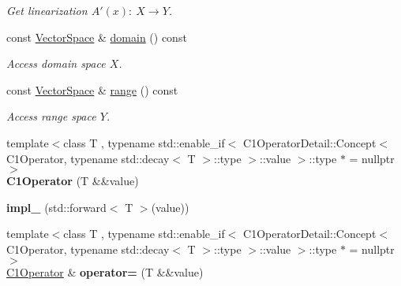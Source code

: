 \begin{DoxyCompactItemize}
\begin{DoxyCompactList}\small\item\em \-Get linearization $A'(x):\ X\to Y $. \end{DoxyCompactList}\item 
\hypertarget{classSpacy_1_1C1Operator_aee0ffd5cee0b8a8df2f0b67b5aaf0ddb}{const \hyperlink{classSpacy_1_1VectorSpace}{\-Vector\-Space} \& \hyperlink{classSpacy_1_1C1Operator_aee0ffd5cee0b8a8df2f0b67b5aaf0ddb}{domain} () const }\label{classSpacy_1_1C1Operator_aee0ffd5cee0b8a8df2f0b67b5aaf0ddb}

\begin{DoxyCompactList}\small\item\em \-Access domain space $X$. \end{DoxyCompactList}\item 
\hypertarget{classSpacy_1_1C1Operator_a7df27427591907b13776e7ba3707bf05}{const \hyperlink{classSpacy_1_1VectorSpace}{\-Vector\-Space} \& \hyperlink{classSpacy_1_1C1Operator_a7df27427591907b13776e7ba3707bf05}{range} () const }\label{classSpacy_1_1C1Operator_a7df27427591907b13776e7ba3707bf05}

\begin{DoxyCompactList}\small\item\em \-Access range space $Y$. \end{DoxyCompactList}\item 
\hypertarget{classSpacy_1_1C1Operator_a9a46e9d2fb4526fa320480b832c5b71e}{{\footnotesize template$<$class T , typename std\-::enable\-\_\-if$<$ C1\-Operator\-Detail\-::\-Concept$<$ C1\-Operator, typename std\-::decay$<$ T $>$\-::type $>$\-::value $>$\-::type $\ast$  = nullptr$>$ }\\{\bfseries \-C1\-Operator} (\-T \&\&value)}\label{classSpacy_1_1C1Operator_a9a46e9d2fb4526fa320480b832c5b71e}

\item 
\hypertarget{classSpacy_1_1C1Operator_ae4068d2989e5aa71b372def134afdd78}{{\bfseries impl\-\_\-} (std\-::forward$<$ \-T $>$(value))}\label{classSpacy_1_1C1Operator_ae4068d2989e5aa71b372def134afdd78}

\item 
\hypertarget{classSpacy_1_1C1Operator_aecfc71bf5da728a9028a586e50afbfcf}{{\footnotesize template$<$class T , typename std\-::enable\-\_\-if$<$ C1\-Operator\-Detail\-::\-Concept$<$ C1\-Operator, typename std\-::decay$<$ T $>$\-::type $>$\-::value $>$\-::type $\ast$  = nullptr$>$ }\\\hyperlink{classSpacy_1_1C1Operator}{\-C1\-Operator} \& {\bfseries operator=} (\-T \&\&value)}\label{classSpacy_1_1C1Operator_aecfc71bf5da728a9028a586e50afbfcf}


\end{DoxyCompactItemize}
